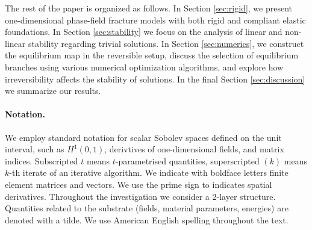

The rest of the paper is organized as follows. In Section \ref{sec:rigid}, we present one-dimensional phase-field fracture models with both rigid and compliant elastic foundations. In Section \ref{sec:stability} we focus on the analysis  of linear and non-linear stability regarding trivial solutions. In Section \ref{sec:numerics}, we construct the equilibrium map in the reversible setup, discuss the selection of equilibrium branches using various numerical optimization algorithms, and explore how irreversibility affects the stability of solutions. In the final Section \ref{sec:discussion}  we summarize our results.


\paragraph{Notation.} We employ standard notation for scalar Sobolev spaces defined on the unit interval, such as $H^1(0, 1)$, derivtives of one-dimensional fields, and matrix indices. Subscripted $t$ means $t$-parametrised quantities, superscripted $(k)$ means $k$-th iterate of an iterative algorithm. 
We indicate with boldface letters finite element matrices and vectors. 
We use the prime sign to indicates spatial derivatives. Throughout the investigation we consider a 2-layer structure. Quantities related to the substrate (fields, material parameters, energies) are denoted with a tilde.
We use American English spelling throughout the text.
